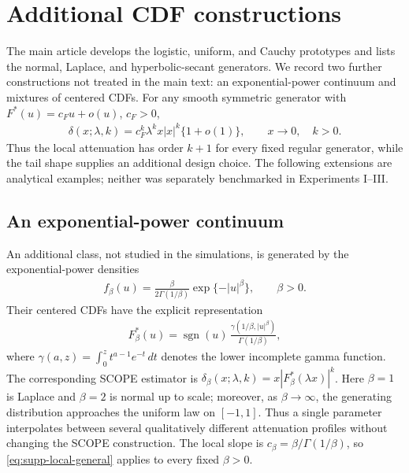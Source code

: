 \documentclass[11pt]{article}
\numberwithin{equation}{section}
\begin{document}
\section{Additional CDF constructions}
\label{supp:additional-cdfs}

The main article develops the logistic, uniform, and Cauchy prototypes
and lists the normal, Laplace, and hyperbolic-secant generators. We
record two further constructions not treated in the main text:
an exponential-power continuum and mixtures of centered CDFs. For any
smooth symmetric generator with $F^*(u)=c_Fu+o(u)$, $c_F>0$,
\begin{eqnarray}
\delta(x;\lambda,k)
= c_F^k\lambda^k x|x|^k\{1+o(1)\},
\qquad x\longrightarrow0,\quad k>0.
\label{eq:supp-local-general}
\end{eqnarray}
Thus the local attenuation has order $k+1$ for every fixed regular
generator, while the tail shape supplies an additional design choice.
The following extensions are analytical examples; neither was separately
benchmarked in Experiments I--III.

\subsection{An exponential-power continuum}
\label{supp:exponential-power}

An additional class, not studied in the simulations, is generated by the
exponential-power densities
\begin{eqnarray}
f_\beta(u)=\frac{\beta}{2\Gamma(1/\beta)}
\exp\{-|u|^\beta\},\qquad \beta>0.
\label{eq:supp-exp-power-density}
\end{eqnarray}
Their centered CDFs have the explicit representation
\begin{eqnarray}
F_\beta^*(u)
=\operatorname{sgn}(u)\,
\frac{\gamma(1/\beta,|u|^\beta)}{\Gamma(1/\beta)},
\label{eq:supp-exp-power-cdf}
\end{eqnarray}
where $\gamma(a,z)=\int_0^z t^{a-1}e^{-t}\,dt$ denotes the lower
incomplete gamma function. The corresponding SCOPE estimator is
$\delta_\beta(x;\lambda,k)=x|F_\beta^*(\lambda x)|^k$.
Here $\beta=1$ is Laplace and $\beta=2$ is normal up to scale;
moreover, as $\beta\to\infty$, the generating distribution
approaches the uniform law on $[-1,1]$. Thus a single parameter
interpolates between several qualitatively different attenuation
profiles without changing the SCOPE construction. The local slope is
$c_\beta=\beta/\Gamma(1/\beta)$, so
\eqref{eq:supp-local-general} applies to every fixed $\beta>0$.
\end{document}
